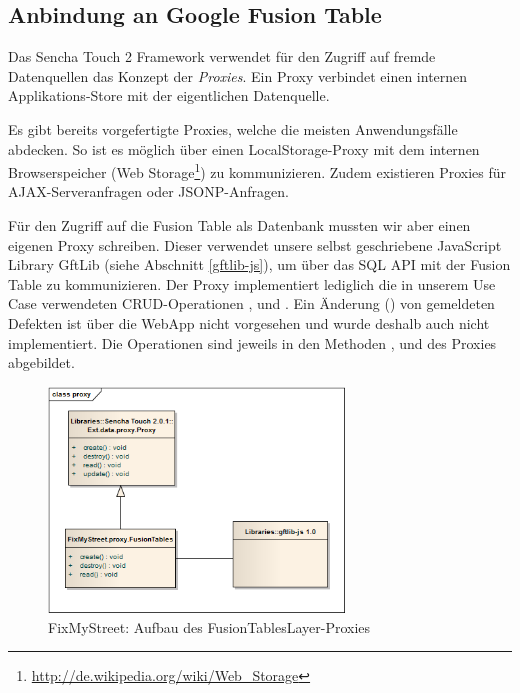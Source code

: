 \subsection{Anbindung an Google Fusion Table}
\label{fixmystreet-proxy}
Das Sencha Touch 2 Framework verwendet für den Zugriff auf fremde Datenquellen das Konzept der \emph{Proxies}. Ein Proxy verbindet einen internen Applikations-Store mit der eigentlichen Datenquelle.

Es gibt bereits vorgefertigte Proxies, welche die meisten Anwendungsfälle abdecken. So ist es möglich über einen LocalStorage-Proxy mit dem internen Browserspeicher (Web Storage\footnote{\url{http://de.wikipedia.org/wiki/Web_Storage}}) zu kommunizieren. Zudem existieren Proxies für \gls{AJAX}-Serveranfragen oder \gls{JSONP}-Anfragen.

Für den Zugriff auf die Fusion Table als Datenbank mussten wir aber einen eigenen Proxy schreiben. Dieser verwendet unsere selbst geschriebene JavaScript Library GftLib (siehe Abschnitt \ref{gftlib-js}), um über das SQL \gls{API} mit der Fusion Table zu kommunizieren.
Der Proxy implementiert lediglich die in unserem Use Case verwendeten \gls{CRUD}-Operationen ,  und . Ein Änderung () von gemeldeten Defekten ist über die \gls{WebApp} nicht vorgesehen und wurde deshalb auch nicht implementiert.
Die Operationen sind jeweils in den Methoden ,  und  des Proxies abgebildet.

\begin{figure}[H]
	\centering
	\includegraphics[width=0.7\textwidth]{images/usecase2-fixmystreet/uml/fixmystreet-proxy-classmodel}
	\caption{FixMyStreet: Aufbau des FusionTablesLayer-Proxies}
	\label{fixmystreet-proxy-classmodel}
\end{figure}

